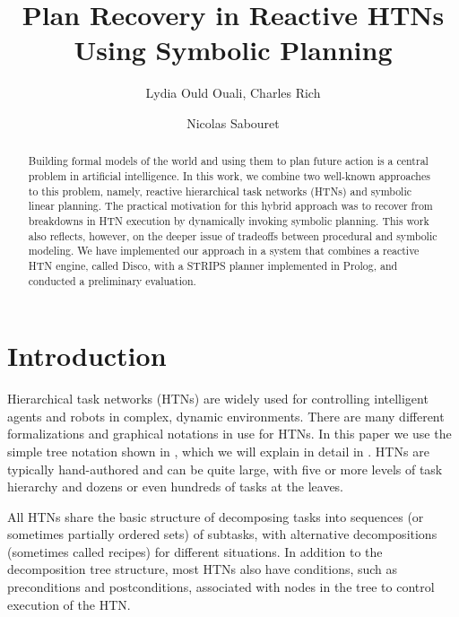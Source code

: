 \documentclass{llncs}
\begin{document}
\title{Plan Recovery in Reactive HTNs\\Using Symbolic Planning\vskip -10pt}

\author{Lydia Ould Ouali, Charles Rich \and
Nicolas Sabouret }

\maketitle 
\begin{abstract}\vskip -20pt
  Building formal models of the world and using them to plan future
  action is a central problem in artificial intelligence.  In this
  work, we combine two well-known approaches to this problem, namely,
  reactive hierarchical task networks (HTNs) and symbolic linear
  planning.  The practical motivation for this hybrid approach was to
  recover from breakdowns in HTN execution by dynamically invoking
  symbolic planning.  This work also reflects, however, on the deeper
  issue of tradeoffs between procedural and symbolic modeling.  We
  have implemented our approach in a system that combines a reactive
  HTN engine, called Disco, with a STRIPS planner implemented in
  Prolog, and conducted a preliminary evaluation.
\end{abstract}

\section{Introduction}

\noindent Hierarchical task networks (HTNs) are widely used for
controlling intelligent agents and robots in complex, dynamic
environments.  There are many different formalizations and graphical
notations in use for HTNs.  In this paper we use the simple tree
notation shown in , which we will explain in detail in
.  HTNs are typically hand-authored and can be quite large,
with five or more levels of task hierarchy and dozens or even
hundreds of tasks at the leaves.

All HTNs share the basic structure of decomposing tasks into sequences
(or sometimes partially ordered sets) of subtasks, with alternative
decompositions (sometimes called recipes) for different situations.
In addition to the decomposition tree structure, most HTNs also have
conditions, such as preconditions and postconditions, associated with
nodes in the tree to control execution of the HTN.
\end{document}
